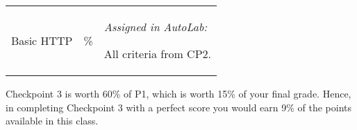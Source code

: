 \begin{center}
\begin{tabular}{>{\centering\arraybackslash}m{1in}>{\centering\arraybackslash}m{1in}p{3in}}
  \hline
  \addlinespace[5pt]

  Basic HTTP&40\%&\vspace{-10pt} 
                              {\it Assigned in AutoLab:}
                              \begin{packed_itemize}
                                \item All criteria from CP2.
                              \end{packed_itemize}\\

\end{tabular}
\end{center}


\noindent Checkpoint 3 is worth 60\% of P1, which is worth 15\% of your final grade. Hence, in completing Checkpoint 3 with a perfect score you would earn 9\% of the points available in this class.

